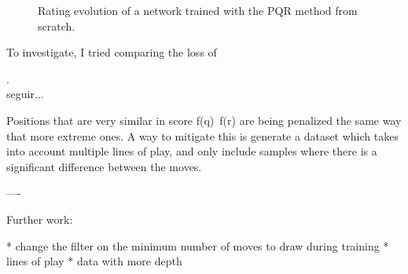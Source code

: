 \begin{figure}[H]
\centering
{}
\caption{Rating evolution of a network trained with the PQR method from scratch.}
\label{pqr1-evolution}
\end{figure}

To investigate, I tried comparing the loss of 

. \\

seguir...

Positions that are very similar in score f(q)~f(r) are being penalized the same way that more extreme ones. A way to mitigate this is generate a dataset which takes into account multiple lines of play, and only include samples where there is a significant difference between the moves.


----

Further work:

* change the filter on the minimum number of moves to draw during training
* lines of play
* data with more depth
